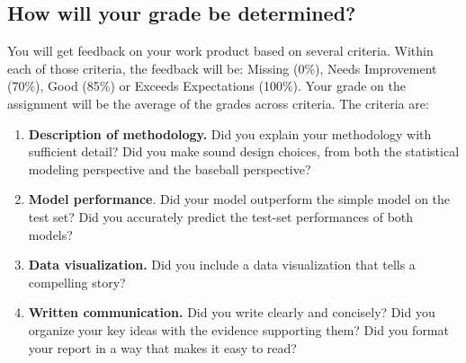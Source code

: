 \documentclass{article}
\begin{document}
    \subsection*{\sc How will your grade be determined?}

      You will get feedback on your work product based on several criteria. Within each of those criteria, the feedback will be: Missing (0\%), Needs Improvement (70\%), Good (85\%) or Exceeds Expectations (100\%). Your grade on the assignment will be the average of the grades across criteria. The criteria are:
      \begin{enumerate}
        \item {\bf Description of methodology.} Did you explain your methodology with sufficient detail? Did you make sound design choices, from both the statistical modeling perspective and the baseball perspective?
        \item {\bf Model performance}. Did your model outperform the simple model on the test set? Did you accurately predict the test-set performances of both models?
        \item {\bf Data visualization.} Did you include a data visualization that tells a compelling story?
        \item {\bf Written communication.} Did you write clearly and concisely? Did you organize your key ideas with the evidence supporting them? Did you format your report in a way that makes it easy to read?
      \end{enumerate}
\end{document}
